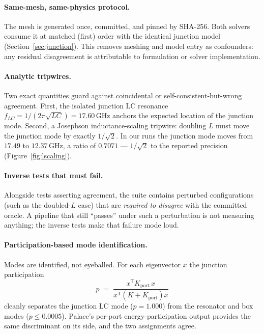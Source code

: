 \documentclass{anvil-paper}
\begin{document}
\paragraph{Same-mesh, same-physics protocol.}
The mesh is generated once, committed, and pinned by SHA-256. Both solvers
consume it at matched (first) order with the identical junction model
(Section~\ref{sec:junction}). This removes meshing and model entry as
confounders: any residual disagreement is attributable to formulation or
solver implementation.

\paragraph{Analytic tripwires.}
Two exact quantities guard against coincidental or self-consistent-but-wrong
agreement. First, the isolated junction LC resonance
$f_{LC} = 1/(2\pi\sqrt{LC}) = 17.60$\,GHz anchors the expected location of
the junction mode. Second, a Josephson inductance-scaling tripwire: doubling
$L$ must move the junction mode by exactly $1/\sqrt{2}$. In our runs the
junction mode moves from $17.49$ to $12.37$\,GHz, a ratio of $0.7071$ ---
$1/\sqrt{2}$ to the reported precision (Figure~\ref{fig:lscaling}).

\paragraph{Inverse tests that must fail.}
Alongside tests asserting agreement, the suite contains perturbed
configurations (such as the doubled-$L$ case) that are \emph{required to
disagree} with the committed oracle. A pipeline that still ``passes'' under
such a perturbation is not measuring anything; the inverse tests make that
failure mode loud.

\paragraph{Participation-based mode identification.}
Modes are identified, not eyeballed. For each eigenvector $x$ the junction
participation
\begin{equation}
  p \;=\; \frac{x^{\mathsf{T}} K_{\mathrm{port}}\, x}
               {x^{\mathsf{T}} \left(K + K_{\mathrm{port}}\right) x}
  \label{eq:participation}
\end{equation}
cleanly separates the junction LC mode ($p = 1.000$) from the resonator and
box modes ($p \leq 0.0005$). Palace's per-port energy-participation output
provides the same discriminant on its side, and the two assignments agree.
\end{document}
